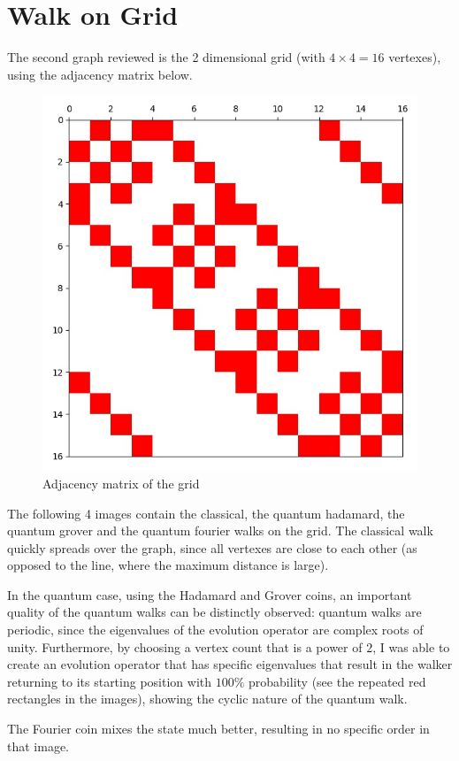 \section{Walk on Grid}

The second graph reviewed is the 2 dimensional grid (with $4\times{}4=16$ vertexes), using the adjacency matrix below.

\begin{figure}[H]
\centering
\includegraphics[width=0.5\linewidth]{./figures/results/grid/graph.jpg}
\caption{Adjacency matrix of the grid}
\end{figure}

The following 4 images contain the classical, the quantum hadamard, the quantum grover and the quantum fourier walks on the grid. The classical walk quickly spreads over the graph, since all vertexes are close to each other (as opposed to the line, where the maximum distance is large).

In the quantum case, using the Hadamard and Grover coins, an important quality of the quantum walks can be distinctly observed: quantum walks are periodic, since the eigenvalues of the evolution operator are complex roots of unity. Furthermore, by choosing a vertex count that is a power of $2$, I was able to create an evolution operator that has specific eigenvalues that result in the walker returning to its starting position
with $100\%$ probability (see the repeated red rectangles in the images), showing the cyclic nature of the quantum walk.

The Fourier coin mixes the state much better, resulting in no specific order in that image.

